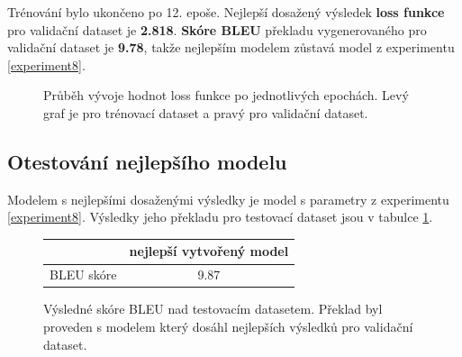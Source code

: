 Trénování bylo ukončeno po 12. epoše. Nejlepší dosažený výsledek \textbf{loss funkce} pro validační dataset je \textbf{2.818}. \textbf{Skóre BLEU} překladu vygenerovaného pro validační dataset je \textbf{9.78}, takže nejlepším modelem zůstavá model z experimentu \ref{experiment8}.

\begin{figure}[H]
    \begin{center}
    \end{center}
	\caption{Průběh vývoje hodnot loss funkce po jednotlivých epochách. Levý graf je pro trénovací dataset a pravý pro validační dataset.}
\end{figure}

\subsection{Otestování nejlepšího modelu} \label{experimentBestModel}
Modelem s nejlepšími dosaženými výsledky je model s parametry z experimentu \ref{experiment8}. Výsledky jeho překladu pro testovací dataset jsou v tabulce \ref{table:bestResults}.

\begin{figure}[H]
    \begin{center}
        \begin{tabular}{c|c}
          & nejlepší vytvořený model  \\
          \hline
          BLEU skóre & 9.87\\
          \hline
        \end{tabular}
    \end{center}
	\caption{Výsledné skóre BLEU nad testovacím datasetem. Překlad byl proveden s modelem který dosáhl nejlepších výsledků pro validační dataset.}
	\label{table:bestResults}
\end{figure}


